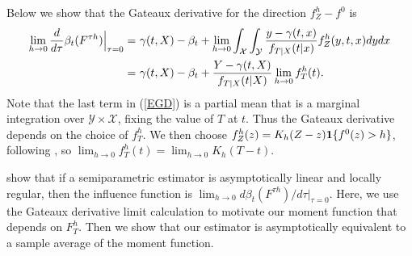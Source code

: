 \documentclass[lettersize, 12pt]{article}
\begin{document}
{Below we show that the Gateaux derivative for the direction $f^h_Z - f^0$ is
\begin{align}
\lim_{h\rightarrow 0}
\frac{d}{d \tau}\beta_t(F^{\tau h})\Big|_{\tau = 0} 
=&\ \gamma(t,X) - \beta_t + \lim_{h\rightarrow 0}\int_{\mathcal{X}}\int_{\mathcal{Y}} 
 \frac{y - \gamma(t,x)}{f_{T|X}(t|x)} f_{Z}^h(y,t,x) dy dx \label{EGD} \\
=&\ \gamma(t,X) - \beta_t + 
\frac{Y - \gamma(t,X)}{f_{T|X}(t|X)} \lim_{h\rightarrow 0} f_T^h(t). \notag
\end{align}
Note that the last term in (\ref{EGD}) is a partial mean that is a marginal integration over $\mathcal{Y} \times \mathcal{X}$, fixing the value of $T$ at $t$.
Thus the Gateaux derivative depends on the choice of $f_{T}^h$.
We then choose $f^h_Z(z) = K_h(Z-z) {\bf 1}\{ f^0(z) > h\}$, following \cite{IchimuraNewey22QE},
so $\lim_{h \rightarrow 0}  f_T^h(t) = \lim_{h \rightarrow 0}  K_h(T-t)$.


\cite{IchimuraNewey22QE} show that if a semiparametric estimator is asymptotically linear and locally regular, then the influence function is $\lim_{h\rightarrow 0} d\beta_t(F^{\tau h})/d\tau|_{\tau=0}$.
Here, we use the Gateaux derivative limit calculation to motivate our moment function that depends on $F_{T}^h$.
Then we show that our estimator is asymptotically equivalent to a sample average of the moment function.

%

}
\end{document}
